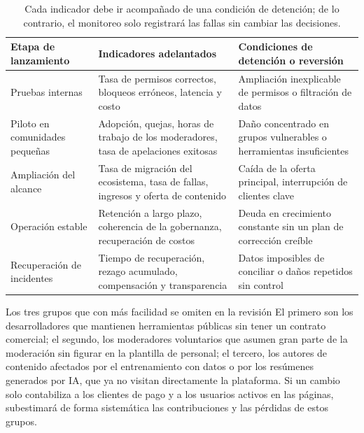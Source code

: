 \begin{table}[H]
\centering
\begin{tabular}{L{0.2\textwidth}L{0.32\textwidth}L{0.38\textwidth}}
\toprule
Etapa de lanzamiento & Indicadores adelantados & Condiciones de detención o reversión \\
\midrule
Pruebas internas & Tasa de permisos correctos, bloqueos erróneos, latencia y costo & Ampliación inexplicable de permisos o filtración de datos \\
Piloto en comunidades pequeñas & Adopción, quejas, horas de trabajo de los moderadores, tasa de apelaciones exitosas & Daño concentrado en grupos vulnerables o herramientas insuficientes \\
Ampliación del alcance & Tasa de migración del ecosistema, tasa de fallas, ingresos y oferta de contenido & Caída de la oferta principal, interrupción de clientes clave \\
Operación estable & Retención a largo plazo, coherencia de la gobernanza, recuperación de costos & Deuda en crecimiento constante sin un plan de corrección creíble \\
Recuperación de incidentes & Tiempo de recuperación, rezago acumulado, compensación y transparencia & Datos imposibles de conciliar o daños repetidos sin control \\
\bottomrule
\end{tabular}
\caption{Cada indicador debe ir acompañado de una condición de detención; de lo contrario, el monitoreo solo registrará las fallas sin cambiar las decisiones.}
\end{table}

\begin{warningbox}{Los tres grupos que con más facilidad se omiten en la revisión}
El primero son los desarrolladores que mantienen herramientas públicas sin tener un contrato comercial; el segundo, los moderadores voluntarios que asumen gran parte de la moderación sin figurar en la plantilla de personal; el tercero, los autores de contenido afectados por el entrenamiento con datos o por los resúmenes generados por IA, que ya no visitan directamente la plataforma. Si un cambio solo contabiliza a los clientes de pago y a los usuarios activos en las páginas, subestimará de forma sistemática las contribuciones y las pérdidas de estos grupos.
\end{warningbox}


